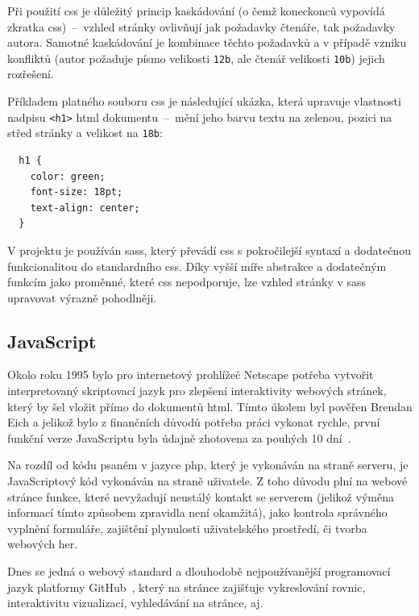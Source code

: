 \documentclass[a4paper, 12pt, twoside]{article}
\begin{document}
  Při použití \gls{css} je důležitý princip kaskádování (o čemž koneckonců vypovídá zkratka \gls{css})~--~vzhled stránky ovlivňují jak požadavky čtenáře, tak požadavky autora. Samotné kaskádování je kombinace těchto požadavků a v případě vzniku konfliktů (autor požaduje písmo velikosti \texttt{12b}, ale čtenář velikosti \texttt{10b}) jejich rozřešení.

  Příkladem platného souboru \gls{css} je následující ukázka, která upravuje vlastnosti nadpisu \texttt{<h1>} \gls{html} dokumentu~--~mění jeho barvu textu na zelenou, pozici na střed stránky a velikost na \texttt{18b}:

  \begin{verbatim}
  h1 {
    color: green;
    font-size: 18pt;
    text-align: center;
  }
  \end{verbatim}

  V projektu je používán \gls{sass}, který převádí \gls{css} s pokročilejší syntaxí a dodatečnou funkcionalitou do standardního \gls{css}. Díky vyšší míře abstrakce a dodatečným funkcím jako proměnné, které \gls{css} nepodporuje, lze vzhled stránky v \gls{sass} upravovat výrazně pohodlněji.


  \subsection{JavaScript} \label{sec:JavaScript}
  Okolo roku 1995 bylo pro internetový prohlížeč Netscape potřeba vytvořit interpretovaný skriptovací jazyk pro zlepšení interaktivity webových stránek, který by šel vložit přímo do dokumentů \gls{html}. Tímto úkolem byl pověřen Brendan Eich a jelikož bylo z finančních důvodů potřeba práci vykonat rychle, první funkční verze JavaScriptu byla údajně zhotovena za pouhých 10 dní~\cite{the-origin-of-javascript}.

  Na rozdíl od kódu psaném v jazyce \gls{php}, který je vykonáván na straně serveru, je JavaScriptový kód vykonáván na straně uživatele. Z toho důvodu plní na webové stránce funkce, které nevyžadují neustálý kontakt se serverem (jelikož výměna informací tímto způsobem zpravidla není okamžitá), jako kontrola správného vyplnění formuláře, zajištění plynulosti uživatelského prostředí, či tvorba webových her.

  Dnes se jedná o webový standard a dlouhodobě nejpoužívanější programovací jazyk platformy GitHub~\cite{github-statistics}, který na stránce zajišťuje vykreslování rovnic, interaktivitu vizualizací, vyhledávání na stránce, aj.
\end{document}
